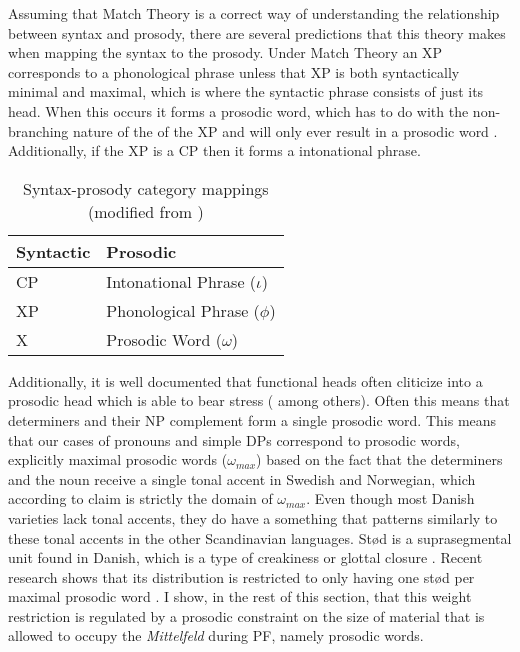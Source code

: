 \documentclass[12pt, letterpaper]{article}
\begin{document}
Assuming that Match Theory \citep{selkirkClauseIntonationalPhrase2009,selkirkSyntaxPhonologyInterface2011} is a correct way of understanding the relationship between syntax and prosody, there are several predictions that this theory makes when mapping the syntax to the prosody. Under Match Theory an XP corresponds to a phonological phrase unless that XP is both syntactically minimal and maximal, which is where the syntactic phrase consists of just its head. When this occurs it forms a prosodic word, which has to do with the non-branching nature of the of the XP and will only ever result in a prosodic word  \citep{bennettLightestRightApparently2016}. Additionally, if the XP is a CP then it forms a intonational phrase.
\begin{table}[!h]
\caption{Syntax-prosody category mappings (modified from \cite{tylerSimplifyingMATCHWORD2019})}
\label{tab:Mappings}
\centering
\begin{tabular}{ll}
\hline
\textbf{Syntactic}&\textbf{Prosodic}\\
\hline
CP & Intonational Phrase ($\iota$)\\
XP & Phonological Phrase ($\phi$) \\
X & Prosodic Word ($\omega$)\\
\hline
\end{tabular}
\end{table}  

Additionally, it is well documented that functional heads often cliticize into a prosodic head which is able to bear stress (\cite{zwickyClitics1977,selkirkProsodicStructureIts1981,zwickyCliticizationVsInflection1983,inkelasProsodicConstituencyLexicon1990} among others). Often this means that determiners and their NP complement form a single prosodic word. This means that our cases of pronouns and simple DPs correspond to prosodic words, explicitly maximal prosodic words ($\omega_{max}$) based on the fact that the determiners and the noun receive a single tonal accent in Swedish and Norwegian, which according to  claim is strictly the domain of $\omega_{max}$. Even though most Danish varieties lack tonal accents, they do have a something that patterns similarly to these tonal accents in the other Scandinavian languages. Stød is a suprasegmental unit found in Danish, which is a type of creakiness or glottal closure \citep{basbollPhonologyDanish2005}. Recent research shows that its distribution is restricted to only having one stød per maximal prosodic word \citep{kalivodaProsodicRecursionPseudocyclicity2018}. I show, in the rest of this section, that this weight restriction is regulated by a prosodic constraint on the size of material that is allowed to occupy the \emph{Mittelfeld} during PF, namely prosodic words. 
\end{document}

